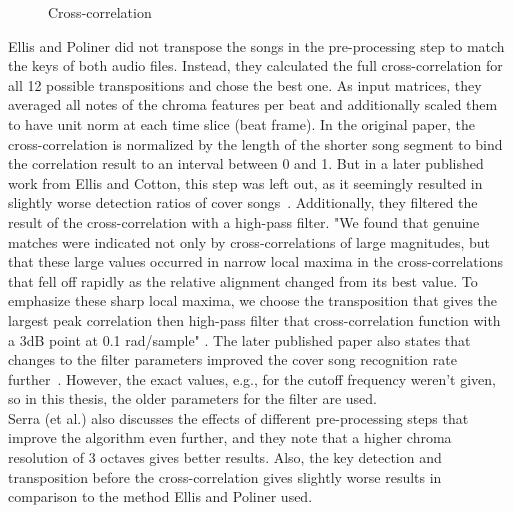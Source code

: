 \begin{figure}[htbp]
	\centering
	\caption{Cross-correlation}
	\label{fig:corr1}
\end{figure}
Ellis and Poliner did not transpose the songs in the pre-processing step to match the keys of both audio files. Instead, they calculated the full cross-correlation for all 12 possible transpositions and chose the best one. 
As input matrices, they averaged all notes of the chroma features per beat and additionally scaled them to have unit norm at each time slice (beat frame).
In the original paper, the cross-correlation is normalized by the length of the shorter song segment to bind the correlation result to an interval between 0 and 1. But in a later published work from Ellis and Cotton, this step was left out, as it seemingly resulted in slightly worse detection ratios of cover songs~\cite{cover802}. 
Additionally, they filtered the result of the cross-correlation with a high-pass filter. "We found that genuine matches were indicated not only by cross-correlations of large magnitudes, but that these large values occurred in narrow local maxima in the cross-correlations that fell off rapidly as the relative alignment changed from its best value. To emphasize these sharp local maxima, we choose the transposition that gives the largest peak correlation then high-pass filter that cross-correlation function with a 3dB point at 0.1 rad/sample" \cite[p. 3]{chroma3}. The later published paper also states that changes to the filter parameters improved the cover song recognition rate further~\cite{cover802}. However, the exact values, e.g., for the cutoff frequency weren't given, so in this thesis, the older parameters for the filter are used.\\
Serra (et al.) also discusses the effects of different pre-processing steps that improve the algorithm even further, and they note that a higher chroma resolution of 3 octaves gives better results. Also, the key detection and transposition before the cross-correlation gives slightly worse results in comparison to the method Ellis and Poliner used.\\ 
